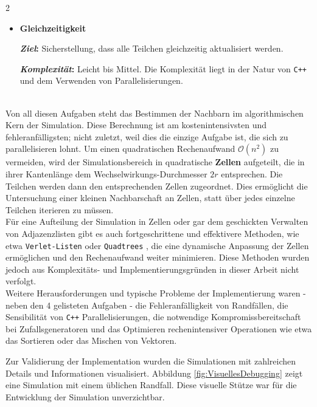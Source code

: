 \documentclass{solutionclass}
\begin{document}
\begin{task}
\begin{multicols}{2}
\begin{itemize}[left=0em, itemsep=0em, topsep=0em, parsep=0em]
        \item {\fontsize{11}{14}\selectfont \textbf{Gleichzeitigkeit}}

        \;\;\textbf{\textit{Ziel}:} Sicherstellung, dass alle Teilchen gleichzeitig aktualisiert werden.
        
        \;\;\textbf{\textit{Komplexität}:} Leicht bis Mittel. Die Komplexität liegt in der Natur von \texttt{C++} und dem Verwenden von Parallelisierungen.\\
        \;\\
    \end{itemize}
\end{multicols}
\end{task}


Von all diesen Aufgaben steht das Bestimmen der Nachbarn im algorithmischen Kern der Simulation. Diese Berechnung ist am kostenintensivsten und fehleranfälligsten; nicht zuletzt, weil dies die einzige Aufgabe ist, die sich zu parallelisieren lohnt. Um einen quadratischen Rechenaufwand $\mathcal{O}(n^2)$ zu vermeiden, wird der Simulationsbereich in quadratische \textbf{Zellen} aufgeteilt, die in ihrer Kantenlänge dem Wechselwirkungs-Durchmesser $2r$ entsprechen. Die Teilchen werden dann den entsprechenden Zellen zugeordnet. Dies ermöglicht die Untersuchung einer kleinen Nachbarschaft an Zellen, statt über jedes einzelne Teilchen iterieren zu müssen.\\

Für eine Aufteilung der Simulation in Zellen oder gar dem geschickten Verwalten von Adjazenzlisten gibt es auch fortgeschrittene und effektivere Methoden, wie etwa \texttt{Verlet-Listen} \cite{VerletListe} oder \texttt{Quadtrees} \cite{Quadtree}, die eine dynamische Anpassung der Zellen ermöglichen und den Rechenaufwand weiter minimieren. Diese Methoden wurden jedoch aus Komplexitäts- und Implementierungsgründen in dieser Arbeit nicht verfolgt.\\

Weitere Herausforderungen und typische Probleme der Implementierung waren - neben den 4 gelisteten Aufgaben - die Fehleranfälligkeit von Randfällen, die Sensibilität von \texttt{C++} Parallelisierungen, die notwendige Kompromissbereitschaft bei Zufallsgeneratoren und das Optimieren rechenintensiver Operationen wie etwa das Sortieren oder das Mischen von Vektoren.

Zur Validierung der Implementation wurden die Simulationen mit zahlreichen Details und Informationen visualisiert. Abbildung \ref{fig:VisuellesDebugging} zeigt eine Simulation mit einem üblichen Randfall. Diese visuelle Stütze war für die Entwicklung der Simulation unverzichtbar.
\end{document}
